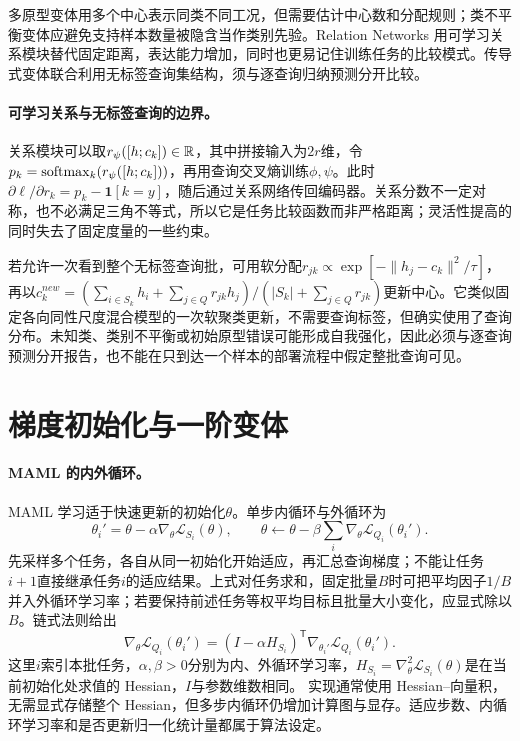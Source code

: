 多原型变体用多个中心表示同类不同工况，但需要估计中心数和分配规则；类不平衡变体应避免支持样本数量被隐含当作类别先验。Relation Networks 用可学习关系模块替代固定距离\cite{sung2018relation}，表达能力增加，同时也更易记住训练任务的比较模式。传导式变体联合利用无标签查询集结构，须与逐查询归纳预测分开比较。

\paragraph{可学习关系与无标签查询的边界。}
关系模块可以取$r_\psi([h;c_k])\in\mathbb{R}$，其中拼接输入为$2r$维，令$p_k=\operatorname{softmax}_k(r_\psi([h;c_k]))$，再用查询交叉熵训练$\phi,\psi$。此时$\partial\ell/\partial r_k=p_k-\mathbf1[k=y]$，随后通过关系网络传回编码器。关系分数不一定对称，也不必满足三角不等式，所以它是任务比较函数而非严格距离；灵活性提高的同时失去了固定度量的一些约束。

若允许一次看到整个无标签查询批，可用软分配$r_{jk}\propto\exp[-\|h_j-c_k\|^2/\tau]$，再以$c_k^{new}=(\sum_{i\in S_k}h_i+\sum_{j\in Q}r_{jk}h_j)/(|S_k|+\sum_{j\in Q}r_{jk})$更新中心。它类似固定各向同性尺度混合模型的一次软聚类更新，不需要查询标签，但确实使用了查询分布。未知类、类别不平衡或初始原型错误可能形成自我强化，因此必须与逐查询预测分开报告，也不能在只到达一个样本的部署流程中假定整批查询可见。

\section{梯度初始化与一阶变体}
\paragraph{MAML 的内外循环。}
MAML 学习适于快速更新的初始化$\theta$\cite{finn2017maml}。单步内循环与外循环为
\begin{equation}
 \theta_i'=\theta-\alpha\nabla_\theta\mathcal L_{S_i}(\theta),
 \qquad\theta\leftarrow\theta-\beta\sum_i\nabla_\theta\mathcal L_{Q_i}(\theta_i').
\end{equation}
先采样多个任务，各自从同一初始化开始适应，再汇总查询梯度；不能让任务$i+1$直接继承任务$i$的适应结果。上式对任务求和，固定批量$B$时可把平均因子$1/B$并入外循环学习率；若要保持前述任务等权平均目标且批量大小变化，应显式除以$B$。链式法则给出
\begin{equation}
 \nabla_\theta\mathcal L_{Q_i}(\theta_i')
 =(I-\alpha H_{S_i})^{\mathsf T}\nabla_{\theta_i'}\mathcal L_{Q_i}(\theta_i').
\end{equation}
这里$i$索引本批任务，$\alpha,\beta>0$分别为内、外循环学习率，$H_{S_i}=\nabla_\theta^2\mathcal L_{S_i}(\theta)$是在当前初始化处求值的 Hessian，$I$与参数维数相同。
实现通常使用 Hessian--向量积，无需显式存储整个 Hessian，但多步内循环仍增加计算图与显存。适应步数、内循环学习率和是否更新归一化统计量都属于算法设定。

